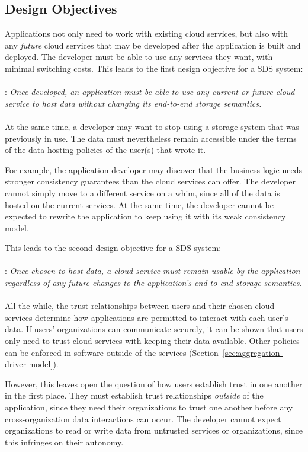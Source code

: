 \subsection{Design Objectives}

Applications not only need to work with existing cloud services, but also with
any \emph{future} cloud services that may be developed after the application is
built and deployed.  The developer must be able to use any services they want,
with minimal switching costs.  This leads to the first design objective for a SDS
system:
\\
\\
: \emph{Once developed, an application must be
able to use any current or future 
cloud service to host data without changing its end-to-end storage semantics.}
\\
\\
At the same time, a developer may want to stop using a storage system that was
previously in use.  The data must nevertheless remain accessible under the
terms of the data-hosting policies of the user(s) that wrote it.

For example, the application developer may discover that the business logic needs stronger
consistency guarantees than the cloud services can offer.  The developer cannot
simply move to a different service on a whim, since all of the data is hosted 
on the current services.  At the same time, the developer cannot be expected
to rewrite the application to keep using it with its weak consistency model.

This leads to the second design objective for a SDS system:
\\
\\
: \emph{Once chosen to host data, a cloud service
must remain usable by the application regardless of any future changes to the
application's end-to-end storage semantics.}
\\
\\
All the while, the trust relationships between users and
their chosen cloud services determine how applications are permitted to
interact with each user's data.  If users' organizations can communicate securely,
it can be shown that users only need to trust cloud services with
keeping their data available.  Other policies can be enforced
in software outside of the services (Section~\ref{sec:aggregation-driver-model}).

However, this leaves open the question of how users establish
trust in one another in the first place.  They must
establish trust relationships \emph{outside} of the application, since they need
their organizations to trust one another
before any cross-organization data interactions can occur.  The developer
cannot expect organizations to read or write data from untrusted services or
organizations, since this infringes on their autonomy.

